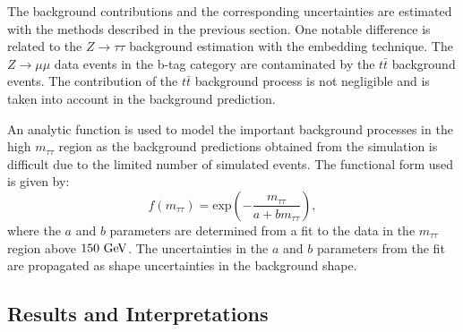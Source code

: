 The background contributions and the corresponding uncertainties are estimated with the methods described in the previous section. One notable difference is related to the $Z \rightarrow\tau\tau$ background estimation with the embedding technique. The $Z\rightarrow\mu\mu$ data events in the b-tag category are contaminated by the $t\bar{t}$ background events. The contribution of the $t\bar{t}$  background process is not negligible and is taken into account in the background prediction. 

An analytic function is used to model the important background  processes in the high $m_{\tau\tau}$ region as the background predictions obtained from the simulation is difficult due to the  limited number of simulated events. The functional form used is given by:
\begin{equation} \label{eq:fc}
f(m_{\tau\tau}) = \mathrm{exp}\left( -\frac{m_{\tau\tau}}{a+bm_{\tau\tau}}\right),
\end{equation}
where the $a$ and $b$ parameters are determined from a fit to the data in the $m_{\tau\tau}$ region above $150~\mathrm{Ge\kern -0.1em V}$. The uncertainties in the $a$ and $b$ parameters from the fit are propagated as shape uncertainties in the background shape. 

\subsection{Results and Interpretations}

